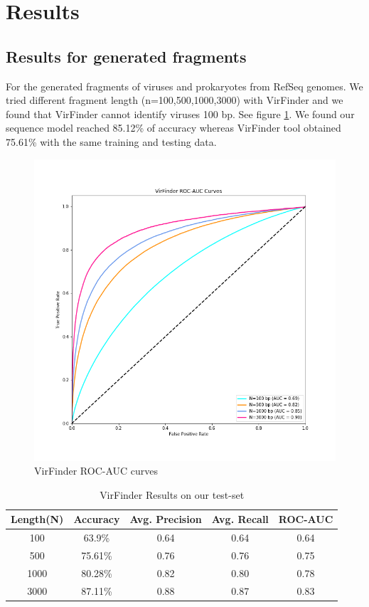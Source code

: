 \documentclass[conference]{IEEEtran}
\begin{document}
\section{Results}

\subsection{Results for generated fragments}
For the generated fragments of viruses and prokaryotes from RefSeq genomes. 
We tried different fragment length (n=100,500,1000,3000) with VirFinder and we found that VirFinder cannot identify viruses 100 bp. See figure \ref{fig:roc_auc_virfinder}.
We found our sequence model reached 85.12\% of accuracy whereas VirFinder tool obtained 75.61\% with the same training and testing data.

\begin{figure}
	\centering
	\includegraphics[width=\columnwidth]{imgs/roc_auc.png}
	\caption{VirFinder ROC-AUC curves}
	\label{fig:roc_auc_virfinder}
\end{figure}


\begin{table}[h!]
	\centering
	\begin{tabular}{||c c c c c||} 
		Length(N) &	Accuracy & Avg. Precision & Avg. Recall &	ROC-AUC \\ [0.5ex] 
		\hline\hline
		100 &	63.9\%	& 0.64 & 0.64 & 0.64 \\
		500 &	75.61\% &	0.76 & 0.76 & 0.75 \\
		1000 &	80.28\% & 0.82 & 0.80 & 0.78 \\
		3000 &	87.11\% & 0.88 & 0.87 & 0.83\\[1ex]
	\end{tabular}
	\caption{VirFinder Results on our test-set}
	\label{table:virfinder_results}
\end{table}
\end{document}
